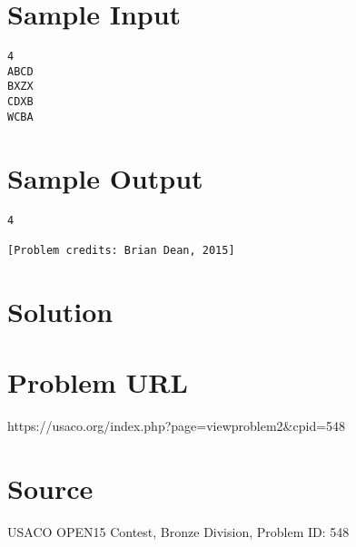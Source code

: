 \documentclass[12pt]{article}
\begin{document}
\section*{Sample Input}
\begin{verbatim}
4
ABCD
BXZX
CDXB
WCBA
\end{verbatim}

\section*{Sample Output}
\begin{verbatim}
4

[Problem credits: Brian Dean, 2015]
\end{verbatim}

\section*{Solution}


\section*{Problem URL}
https://usaco.org/index.php?page=viewproblem2&cpid=548

\section*{Source}
USACO OPEN15 Contest, Bronze Division, Problem ID: 548
\end{document}
